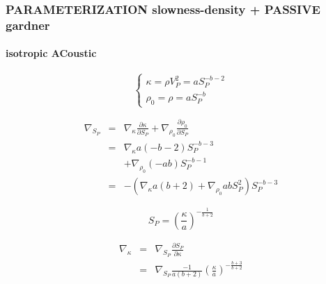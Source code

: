 \documentclass[9pt]{beamer}
\newcommand{\partderi}[2]{\frac{\partial#1}{\partial#2}}
\begin{document}
\begin{frame}\frametitle{PARAMETERIZATION slowness-density + PASSIVE gardner}
\framesubtitle{isotropic ACoustic}

  \begin{center}
  \end{center}

  \begin{minipage}{0.5\linewidth}
    \[\left\{ \begin{array}{l}
      \kappa = \rho V_P^2 = a S_P^{-b-2} \\
      \rho_0 = \rho = a S_P ^{-b}
    \end{array} \right.\]
    
    \begin{eqnarray}
      \nabla_{S_P} &=& \nabla_{\kappa} \partderi{\kappa}{S_P} + \nabla_{\rho_0} \partderi{\rho_0}{S_P} \nonumber\\
                   &=& \nabla_{\kappa} a(-b-2) S_P^{-b-3} \nonumber\\
                   & &+\nabla_{\rho_0} (-ab) S_P^{-b-1} \nonumber\\
                   &=&-\left( \nabla_{\kappa} a(b+2) + \nabla_{\rho_0} abS_P^2 \right) S_P^{-b-3} \nonumber
    \end{eqnarray}

  \end{minipage} \vline
  \begin{minipage}{0.45\linewidth}
    \[ S_P = \left(\frac{\kappa}{a}\right)^{-\frac{1}{b+2}} \]
    
    \begin{eqnarray}
      \nabla_{\kappa} &=& \nabla_{S_P} \partderi{S_P}{\kappa} \nonumber\\
                      &=& \nabla_{S_P} \frac{-1}{a(b+2)} \left(\frac{\kappa}{a}\right)^{-\frac{b+3}{b+2}} \nonumber
    \end{eqnarray}
  \end{minipage}

\end{frame}
\end{document}
